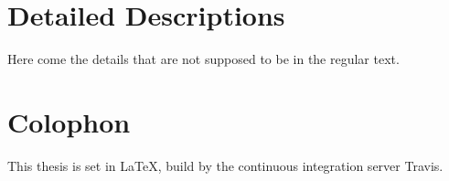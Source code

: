 \chapter{Detailed Descriptions}
\label{chapter:DetailedDescriptions}
Here come the details that are not supposed to be in the regular text.


\chapter{Colophon}
This thesis is set in \LaTeX \cite{latex}, build by the continuous integration server Travis.
